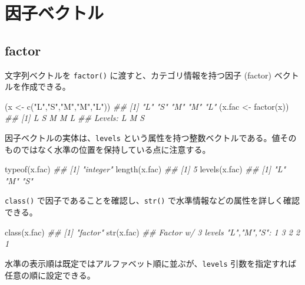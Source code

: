 \documentclass[
  letterpaper,
  xelatex,
  ja=standard, xelatex]{bxjsbook}
\newenvironment{Shaded}{\begin{snugshade}}{\end{snugshade}}
\newcommand{\DocumentationTok}[1]{\textcolor[rgb]{0.37,0.37,0.37}{\textit{#1}}}
\newcommand{\FunctionTok}[1]{\textcolor[rgb]{0.28,0.35,0.67}{#1}}
\newcommand{\NormalTok}[1]{\textcolor[rgb]{0.00,0.23,0.31}{#1}}
\newcommand{\OtherTok}[1]{\textcolor[rgb]{0.00,0.23,0.31}{#1}}
\newcommand{\StringTok}[1]{\textcolor[rgb]{0.13,0.47,0.30}{#1}}
\begin{document}
\section{因子ベクトル}\label{ux56e0ux5b50ux30d9ux30afux30c8ux30eb}

\subsection{factor}\label{factor}

文字列ベクトルを \texttt{factor()} に渡すと、カテゴリ情報を持つ因子
(factor) ベクトルを作成できる。

\begin{Shaded}
\begin{Highlighting}[]
\NormalTok{(x }\OtherTok{\textless{}{-}} \FunctionTok{c}\NormalTok{(}\StringTok{"L"}\NormalTok{,}\StringTok{"S"}\NormalTok{,}\StringTok{"M"}\NormalTok{,}\StringTok{"M"}\NormalTok{,}\StringTok{"L"}\NormalTok{))}
\DocumentationTok{\#\# [1] "L" "S" "M" "M" "L"}
\NormalTok{(x.fac }\OtherTok{\textless{}{-}} \FunctionTok{factor}\NormalTok{(x))}
\DocumentationTok{\#\# [1] L S M M L}
\DocumentationTok{\#\# Levels: L M S}
\end{Highlighting}
\end{Shaded}

因子ベクトルの実体は、\texttt{levels}
という属性を持つ整数ベクトルである。値そのものではなく水準の位置を保持している点に注意する。

\begin{Shaded}
\begin{Highlighting}[]
\FunctionTok{typeof}\NormalTok{(x.fac)}
\DocumentationTok{\#\# [1] "integer"}
\FunctionTok{length}\NormalTok{(x.fac)}
\DocumentationTok{\#\# [1] 5}
\FunctionTok{levels}\NormalTok{(x.fac)}
\DocumentationTok{\#\# [1] "L" "M" "S"}
\end{Highlighting}
\end{Shaded}

\texttt{class()} で因子であることを確認し、\texttt{str()}
で水準情報などの属性を詳しく確認できる。

\begin{Shaded}
\begin{Highlighting}[]
\FunctionTok{class}\NormalTok{(x.fac)}
\DocumentationTok{\#\# [1] "factor"}
\FunctionTok{str}\NormalTok{(x.fac)}
\DocumentationTok{\#\#  Factor w/ 3 levels "L","M","S": 1 3 2 2 1}
\end{Highlighting}
\end{Shaded}

水準の表示順は既定ではアルファベット順に並ぶが、\texttt{levels}
引数を指定すれば任意の順に設定できる。
\end{document}
